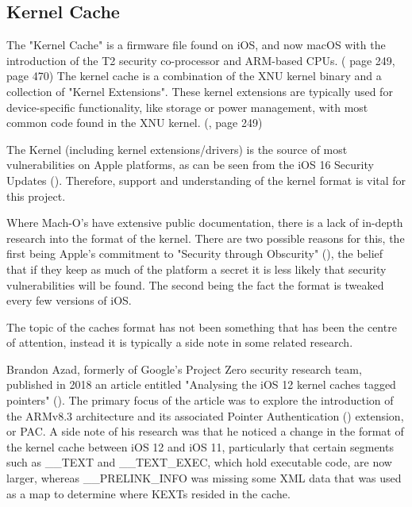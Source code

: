 \subsection{Kernel Cache}


The "Kernel Cache" is a firmware file found on iOS, and now macOS with the introduction of the T2 security co-processor and ARM-based CPUs. (\cite{esser-hackers-handbook} page 249, \cite{levin-os-internals-vol3} page 470) The kernel cache is a combination of the XNU kernel binary and a collection of "Kernel Extensions". These kernel extensions are typically used for device-specific functionality, like storage or power management, with most common code found in the XNU kernel. (\cite{esser-hackers-handbook}, page 249)



The Kernel (including kernel extensions/drivers) is the source of most vulnerabilities on Apple platforms, as can be seen from the iOS 16 Security Updates (\cite{apple-ios16-security-content}). Therefore, support and understanding of the kernel format is vital for this project. 

Where Mach-O's have extensive public documentation, there is a lack of in-depth research into the format of the kernel. There are two possible reasons for this, the first being Apple's commitment to "Security through Obscurity" (\cite{security-through-obscurity}), the belief that if they keep as much of the platform a secret it is less likely that security vulnerabilities will be found. The second being the fact the format is tweaked every few versions of iOS.

The topic of the caches format has not been something that has been the centre of attention, instead it is typically a side note in some related research.


Brandon Azad, formerly of Google's Project Zero security research team, published in 2018 an article entitled "Analysing the iOS 12 kernel caches tagged pointers" (\cite{azad-tagged-pointers}). The primary focus of the article was to explore the introduction of the ARMv8.3 architecture and its associated Pointer Authentication (\cite{rutland-pac-slides}) extension, or PAC. A side note of his research was that he noticed a change in the format of the kernel cache between iOS 12 and iOS 11, particularly that certain segments such as \_\_TEXT and \_\_TEXT\_EXEC, which hold executable code, are now larger, whereas \_\_PRELINK\_INFO was missing some XML data that was used as a map to determine where KEXTs resided in the cache. 

